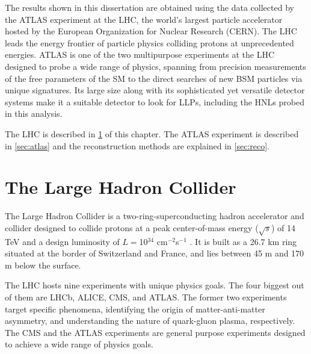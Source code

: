 The results shown in this dissertation are obtained using the data collected by the ATLAS experiment at the LHC, the world's largest particle accelerator hosted by the European Organization for Nuclear Research (CERN). The LHC leads the energy frontier of particle physics colliding protons at unprecedented energies. ATLAS is one of the two multipurpose experiments at the LHC designed to probe a wide range of physics, spanning from precision measurements of the free parameters of the SM to the direct searches of new BSM particles via unique signatures. Its large size along with its sophisticated yet versatile detector systems make it a suitable detector to look for LLPs, including the HNLs probed in this analysis.

The LHC is described in \cref{sec:lhc} of this chapter. The ATLAS experiment is described in \cref{sec:atlas} and the reconstruction methods are explained in \cref{sec:reco}.

\section{The Large Hadron Collider} \label{sec:lhc}

The Large Hadron Collider is a two-ring-superconducting hadron accelerator and collider designed to collide protons at a peak center-of-mass energy ($\sqrt{s}$) of 14 TeV and a design luminosity of $L=$10$^{34}$ cm$^{-2}$s$^{-1}$ \cite{LHC}. It is built as a 26.7 km ring situated at the border of Switzerland and France, and lies between 45 m and 170 m below the surface.

The LHC hosts nine experiments with unique physics goals. The four biggest out of them are LHCb, ALICE, CMS, and ATLAS. The former two experiments target specific phenomena, identifying the origin of matter-anti-matter asymmetry, and understanding the nature of quark-gluon plasma, respectively. The CMS and the ATLAS experiments are general purpose experiments designed to achieve a wide range of physics goals.

